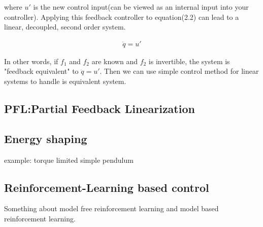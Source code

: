 where \(u'\) is the new control input(can be viewed as an internal input into your controller). Applying this feedback controller to equation(2.2) can lead to a linear, decoupled, second order system.

\begin{align}
  \ddot{q} = u' 
\end{align}

In other words, if \(f_1\) and \(f_2\) are known and \(f_2\) is invertible, the system is "feedback equivalent" to \(\ddot{q} = u' \). Then we can use simple control method for linear systems to handle is equivalent system.

\subsection{PFL:Partial Feedback Linearization}

\subsection{Energy shaping}
example: torque limited simple pendulum

\subsection{Reinforcement-Learning based control}
Something about model free reinforcement learning and model based reinforcement learning.


\cleardoublepage
